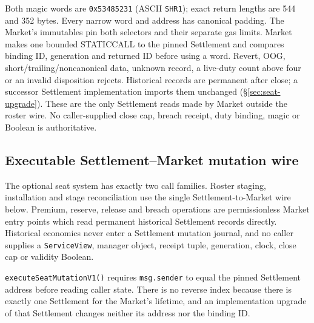 \documentclass[a4paper,11pt]{article}
\newcommand{\code}[1]{\nolinkurl{#1}}
\begin{document}
Both magic words are \code{0x53485231} (ASCII \code{SHR1}); exact return
lengths are 544 and 352 bytes.  Every narrow word and address has canonical
padding.  The Market's immutables pin both selectors and their separate gas
limits.  Market makes one bounded STATICCALL to the pinned Settlement and
compares binding ID, generation and returned ID before using a word.  Revert,
OOG, short/trailing/noncanonical data, unknown record, a live-duty count above
four or an invalid disposition rejects.  Historical records are permanent after
close; a successor Settlement implementation imports them unchanged
(\S\ref{sec:seat-upgrade}).  These are the only Settlement reads made by
Market outside the roster wire.  No caller-supplied close cap, breach receipt,
duty binding, magic or Boolean is authoritative.

\subsection{Executable Settlement--Market mutation wire}

The optional seat system has exactly two call families.  Roster staging,
installation and stage reconciliation use the single Settlement-to-Market wire
below.  Premium, reserve, release and breach operations are permissionless
Market entry points which read permanent historical Settlement records
directly.  Historical economics never enter a Settlement mutation journal, and
no caller supplies a \code{ServiceView}, manager object, receipt tuple,
generation, clock, close cap or validity Boolean.

\code{executeSeatMutationV1()} requires \code{msg.sender} to equal the pinned
Settlement address before reading caller state.  There is no reverse index
because there is exactly one Settlement for the Market's lifetime, and an
implementation upgrade of that Settlement changes neither its address nor the
binding ID.
\end{document}
